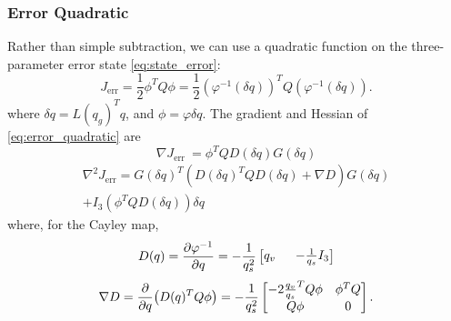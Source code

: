 \documentclass[letterpaper, 10 pt, conference]{ieeeconf}  %
\newcommand{\half}{\frac{1}{2}}
\begin{document}
        \subsubsection{Error Quadratic} \label{sec:error_quadratic}
            Rather than simple subtraction, we can use a quadratic function on the
            three-parameter error state \eqref{eq:state_error}:
            \begin{equation} \label{eq:error_quadratic}
                J_\text{err} = \half \phi^T Q \phi 
                = \half \left(\varphi^{-1}(\delta q)\right)^T Q 
                        \left(\varphi^{-1}(\delta q)\right).
            \end{equation}
            where $\delta q = L(q_g)^T q$, and $\phi = \varphi{\delta q}$. The gradient
            and Hessian of \eqref{eq:error_quadratic} are
            \begin{equation}
                \nabla J_\text{err }= \phi^T Q  D(\delta q)  G(\delta q)
            \end{equation}
            \begin{multline}
                \nabla^2 J_\text{err} = 
                    G(\delta q)^T \! \left(
                    D(\delta q)^T Q D(\delta q) + \nabla D \right) G(\delta q)  \\
                    + I_3 (\phi^T Q  D(\delta q)) \delta q %
            \end{multline}
            where, for the Cayley map,
            \begin{equation}
                D(q) = \pdv{\varphi^{-1}}{q} = -\frac{1}{q_s^2}\begin{bmatrix}
                    q_v \;\; & -\frac{1}{q_s} I_3
                \end{bmatrix}
            \end{equation}
            \begin{equation}
                \nabla D = \pdv{q}(D(q)^T Q \phi) 
                = -\frac{1}{q_s^2} \begin{bmatrix} 
                    -2 \frac{q_v}{q_s}^T Q \phi & \phi^T Q \\
                                   Q \phi & 0 \\
                \end{bmatrix}.
            \end{equation}
\end{document}
